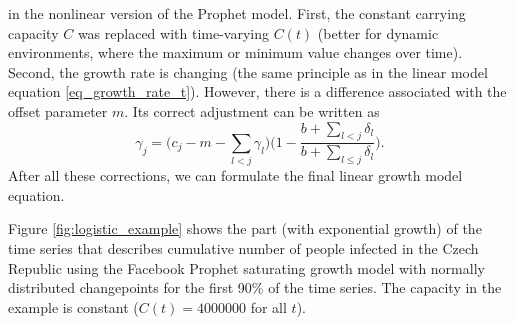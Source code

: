 in the nonlinear version of the Prophet model. First, the constant carrying capacity $C$ was replaced with time-varying $C(t)$ (better for dynamic environments, where the maximum or minimum value changes over time). Second, the growth rate is changing (the same principle as in the linear model equation \ref{eq_growth_rate_t}). However, there is a difference associated with the offset parameter $m$. Its correct adjustment can be written as 
\begin{equation}
    \gamma_j = \bigg(c_j - m - \sum_{l < j} \gamma_l\bigg)\bigg(1 - \frac{b + \sum_{l < j} \delta_l}{b + \sum_{l \leq j} \delta_l}\bigg).
\end{equation}  
After all these corrections, we can formulate the final linear growth model equation.

Figure \ref{fig:logistic_example} shows the part (with exponential growth) of the time series that describes cumulative number of people infected in the Czech Republic using the Facebook Prophet saturating growth model with normally distributed changepoints for the first 90\% of the time series. The capacity in the example is constant ($C(t) = 4000000$ for all $t$). 

